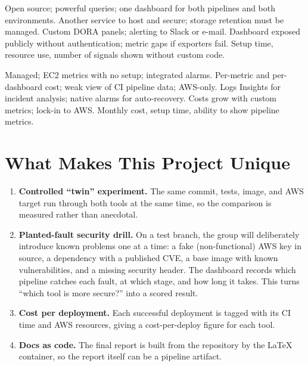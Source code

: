 {Open source; powerful queries; one dashboard for both pipelines and both environments.}
{Another service to host and secure; storage retention must be managed.}
{Custom DORA panels; alerting to Slack or e-mail.}
{Dashboard exposed publicly without authentication; metric gaps if exporters fail.}
{Setup time, resource use, number of signals shown without custom code.}

{Managed; EC2 metrics with no setup; integrated alarms.}
{Per-metric and per-dashboard cost; weak view of CI pipeline data; AWS-only.}
{Logs Insights for incident analysis; native alarms for auto-recovery.}
{Costs grow with custom metrics; lock-in to AWS.}
{Monthly cost, setup time, ability to show pipeline metrics.}

\section{What Makes This Project Unique}
\label{Section:Unique}
\begin{enumerate}
\item \textbf{Controlled ``twin'' experiment.} The same commit, tests, image,
and AWS target run through both tools at the same time, so the comparison is
measured rather than anecdotal.
\item \textbf{Planted-fault security drill.} On a test branch, the group will
deliberately introduce known problems one at a time: a fake (non-functional)
AWS key in source, a dependency with a published CVE, a base image with known
vulnerabilities, and a missing security header. The dashboard records which
pipeline catches each fault, at which stage, and how long it takes. This turns
``which tool is more secure?'' into a scored result.
\item \textbf{Cost per deployment.} Each successful deployment is tagged with
its CI time and AWS resources, giving a cost-per-deploy figure for each tool.
\item \textbf{Docs as code.} The final report is built from the repository by
the LaTeX container, so the report itself can be a pipeline artifact.
\end{enumerate}

